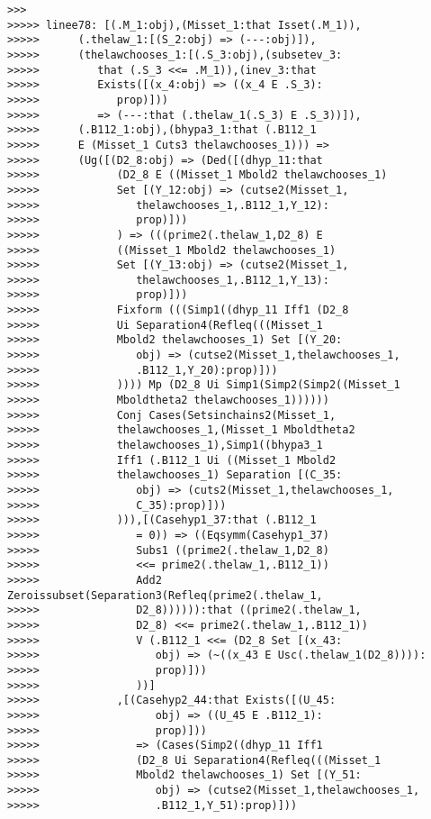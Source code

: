 \documentclass[12pt]{article}
\begin{document}
\begin{verbatim}
>>>
>>>>> linee78: [(.M_1:obj),(Misset_1:that Isset(.M_1)),
>>>>>      (.thelaw_1:[(S_2:obj) => (---:obj)]),
>>>>>      (thelawchooses_1:[(.S_3:obj),(subsetev_3:
>>>>>         that (.S_3 <<= .M_1)),(inev_3:that
>>>>>         Exists([(x_4:obj) => ((x_4 E .S_3):
>>>>>            prop)]))
>>>>>         => (---:that (.thelaw_1(.S_3) E .S_3))]),
>>>>>      (.B112_1:obj),(bhypa3_1:that (.B112_1
>>>>>      E (Misset_1 Cuts3 thelawchooses_1))) =>
>>>>>      (Ug([(D2_8:obj) => (Ded([(dhyp_11:that
>>>>>            (D2_8 E ((Misset_1 Mbold2 thelawchooses_1)
>>>>>            Set [(Y_12:obj) => (cutse2(Misset_1,
>>>>>               thelawchooses_1,.B112_1,Y_12):
>>>>>               prop)]))
>>>>>            ) => (((prime2(.thelaw_1,D2_8) E
>>>>>            ((Misset_1 Mbold2 thelawchooses_1)
>>>>>            Set [(Y_13:obj) => (cutse2(Misset_1,
>>>>>               thelawchooses_1,.B112_1,Y_13):
>>>>>               prop)]))
>>>>>            Fixform (((Simp1((dhyp_11 Iff1 (D2_8
>>>>>            Ui Separation4(Refleq(((Misset_1
>>>>>            Mbold2 thelawchooses_1) Set [(Y_20:
>>>>>               obj) => (cutse2(Misset_1,thelawchooses_1,
>>>>>               .B112_1,Y_20):prop)]))
>>>>>            )))) Mp (D2_8 Ui Simp1(Simp2(Simp2((Misset_1
>>>>>            Mboldtheta2 thelawchooses_1))))))
>>>>>            Conj Cases(Setsinchains2(Misset_1,
>>>>>            thelawchooses_1,(Misset_1 Mboldtheta2
>>>>>            thelawchooses_1),Simp1((bhypa3_1
>>>>>            Iff1 (.B112_1 Ui ((Misset_1 Mbold2
>>>>>            thelawchooses_1) Separation [(C_35:
>>>>>               obj) => (cuts2(Misset_1,thelawchooses_1,
>>>>>               C_35):prop)]))
>>>>>            ))),[(Casehyp1_37:that (.B112_1
>>>>>               = 0)) => ((Eqsymm(Casehyp1_37)
>>>>>               Subs1 ((prime2(.thelaw_1,D2_8)
>>>>>               <<= prime2(.thelaw_1,.B112_1))
>>>>>               Add2 Zeroissubset(Separation3(Refleq(prime2(.thelaw_1,
>>>>>               D2_8)))))):that ((prime2(.thelaw_1,
>>>>>               D2_8) <<= prime2(.thelaw_1,.B112_1))
>>>>>               V (.B112_1 <<= (D2_8 Set [(x_43:
>>>>>                  obj) => (~((x_43 E Usc(.thelaw_1(D2_8)))):
>>>>>                  prop)]))
>>>>>               ))]
>>>>>            ,[(Casehyp2_44:that Exists([(U_45:
>>>>>                  obj) => ((U_45 E .B112_1):
>>>>>                  prop)]))
>>>>>               => (Cases(Simp2((dhyp_11 Iff1
>>>>>               (D2_8 Ui Separation4(Refleq(((Misset_1
>>>>>               Mbold2 thelawchooses_1) Set [(Y_51:
>>>>>                  obj) => (cutse2(Misset_1,thelawchooses_1,
>>>>>                  .B112_1,Y_51):prop)]))

\end{verbatim}
\end{document}
